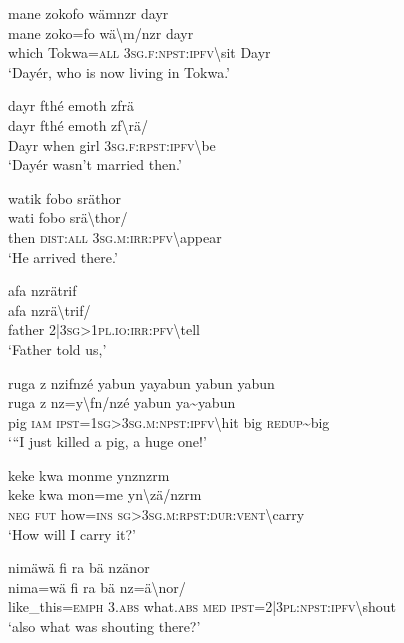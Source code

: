 \ea\label{ex:12:a764}
mane zokofo wämnzr dayr\\
\gll mane	zoko=fo	wä{\textbackslash}m/nzr	dayr\\
     which	Tokwa=\textsc{all}	3\textsc{sg}.\textsc{f}:\textsc{npst}:\textsc{ipfv}{\textbackslash}sit	Dayr\\
\glt `Dayér, who is now living in Tokwa.'
\z

\ea\label{ex:12:a765}
dayr fthé emoth zfrä\\
\gll dayr	fthé	emoth	zf{\textbackslash}rä/\\
     Dayr	when	girl	3\textsc{sg}.\textsc{f}:\textsc{rpst}:\textsc{ipfv}{\textbackslash}be\\
\glt `Dayér wasn't married then.'
\z

\ea\label{ex:12:a766}
watik fobo sräthor\\
\gll wati	fobo	srä{\textbackslash}thor/\\
     then	\textsc{dist}:\textsc{all}	3\textsc{sg}.\textsc{m}:\textsc{irr}:\textsc{pfv}{\textbackslash}appear\\
\glt `He arrived there.'
\z

\ea\label{ex:12:a768}
afa nzrätrif\\
\gll afa	nzrä{\textbackslash}trif/\\
     father	2|3\textsc{sg}>1\textsc{pl}.\textsc{io}:\textsc{irr}:\textsc{pfv}{\textbackslash}tell\\
\glt `Father told us,'
\z

\ea\label{ex:12:a769}
ruga z nzifnzé yabun yayabun yabun yabun\\
\gll ruga	z	nz=y{\textbackslash}fn/nzé	yabun	ya{\textasciitilde}yabun\\
     pig	\textsc{iam}	\textsc{ipst}=1\textsc{sg}>3\textsc{sg}.\textsc{m}:\textsc{npst}:\textsc{ipfv}{\textbackslash}hit	big	\textsc{redup}{\textasciitilde}big\\
\glt `{``}I just killed a pig, a huge one!'
\z

\ea\label{ex:12:a770}
keke kwa monme ynznzrm\\
\gll keke	kwa	mon=me	yn{\textbackslash}zä/nzrm\\
     \textsc{neg}	\textsc{fut}	how=\textsc{ins}	\textsc{sg}>3\textsc{sg}.\textsc{m}:\textsc{rpst}:\textsc{dur}:\textsc{vent}{\textbackslash}carry\\
\glt `How will I carry it?'
\z

\ea\label{ex:12:a771}
nimäwä fi ra bä nzänor\\
\gll nima=wä	fi	ra	bä	nz=ä{\textbackslash}nor/\\
     like\_this=\textsc{emph}	3.\textsc{abs}	what.\textsc{abs}	\textsc{med}	\textsc{ipst}=2|3\textsc{pl}:\textsc{npst}:\textsc{ipfv}{\textbackslash}shout\\
\glt `also what was shouting there?'
\z

